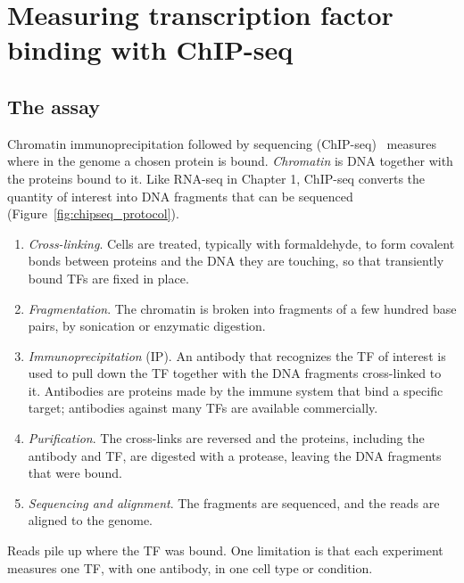 \section{Measuring transcription factor binding with ChIP-seq}
\label{sec:chipseq}

\subsection{The assay}

Chromatin immunoprecipitation followed by sequencing (ChIP-seq)~\citep{johnson2007,park2009} measures where in the genome a chosen protein is bound. \emph{Chromatin} is DNA together with the proteins bound to it. Like RNA-seq in Chapter 1, ChIP-seq converts the quantity of interest into DNA fragments that can be sequenced (Figure~\ref{fig:chipseq_protocol}).
\begin{enumerate}
  \item \emph{Cross-linking}. Cells are treated, typically with formaldehyde, to form covalent bonds between proteins and the DNA they are touching, so that transiently bound TFs are fixed in place.
  \item \emph{Fragmentation}. The chromatin is broken into fragments of a few hundred base pairs, by sonication or enzymatic digestion.
  \item \emph{Immunoprecipitation} (IP). An antibody that recognizes the TF of interest is used to pull down the TF together with the DNA fragments cross-linked to it. Antibodies are proteins made by the immune system that bind a specific target; antibodies against many TFs are available commercially.
  \item \emph{Purification}. The cross-links are reversed and the proteins, including the antibody and TF, are digested with a protease, leaving the DNA fragments that were bound.
  \item \emph{Sequencing and alignment}. The fragments are sequenced, and the reads are aligned to the genome.
\end{enumerate}
Reads pile up where the TF was bound. One limitation is that each experiment measures one TF, with one antibody, in one cell type or condition.

